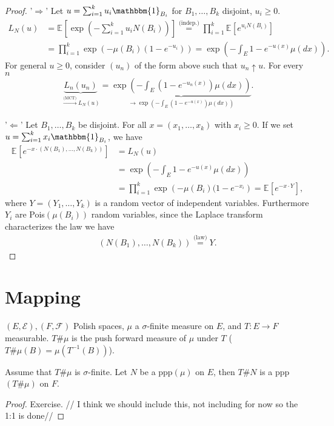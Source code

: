 \begin{proof}
	'$\Longrightarrow$'
	Let $u=\sum_{i=1}^{k} u_i \mathbbm{1}_{B_i} $ for $B_1,\ldots , B_k$ disjoint, $u_i\geq 0$.
	\begin{align}
		L_{N}(u) &= \mathbb{E}_{} \left[ \exp \left( - \sum_{i=1}^{k} u_iN(B_i) \right) \right]  \stackrel{\textrm{(indep.)}}{=} \prod_{i=1}^{k}\mathbb{E}_{} \left[ e^{u_iN(B_i)} \right] \\
			 &=\prod_{i=1}^{k} \exp\left( -\mu (B_i) (1-e^{-u_i}) \right) = \exp \left( - \int_{E}^{} 1-e^{-u(x)}\mu (dx) \right).
	\end{align}
	For general $u\geq 0$, consider $(u_n)$ of the form above such that $u_n \uparrow u$. For every $n$ 
	\begin{align}
		\underbrace{L_n(u_n)}_{\stackrel{\textrm{(MCT)}}{\to}L_N(u)} = \underbrace{\exp \left( - \int_{E}^{} (1-e^{-u_n(x)})\mu (dx) \right)}_{\to \exp\left( - \int_{E}^{} (1-e^{-u(x)}) \mu (dx)\right)}.
	\end{align}

	'$\Longleftarrow$'
	Let $B_1,\ldots , B_k$ be disjoint. For all $x=(x_1,\ldots ,x_k)$ with $x_i\geq 0$. {\color{blue}If we set $u= \sum_{i=1}^{k} x_i \mathbbm{1}_{B_i} $, we have}
\begin{align}
	\mathbb{E}_{} \left[ e^{-x \cdot (N(B_1),\ldots ,N(B_k))} \right] &= L_{N}(u) \\
									  &= \exp \left( - \int_{E}^{} 1 - e^{-u(x)}\mu (dx) \right) \\
									  &= \prod_{i=1}^{k}\exp \left(-\mu (B_i) (1- e^{-x_i} \right) = \mathbb{E}_{} \left[ e^{-x \cdot Y} \right] ,
\end{align}
where $Y=(Y_1, \ldots , Y_k)$ is a random vector of independent variables. Furthermore $Y_i$ are Pois$(\mu (B_i))$ random variables, since the Laplace transform characterizes the law we have
\begin{align}
	(N(B_1), \ldots ,N(B_k)) \stackrel{\textrm{(law)}}{=} Y.
\end{align}
\end{proof}

\section{Mapping}
$(E, \mathcal{E}), (F, \mathcal{F})$ Polish spaces, $\mu$ a $ \sigma$-finite measure on $E$, and $T:E \to F$ measurable. $T\#\mu $ is the push forward measure of $\mu $ under $T$ ($T\#\mu(B)=\mu(T^{-1}(B))$).

\begin{theorem}[]
	Assume that $T\#\mu$ is $\sigma$-finite. Let $N$ be a ppp$(\mu)$ on $E$, then $T\#N$ is a ppp$(T\#\mu)$ on $F$.
\end{theorem}
\begin{proof}
	Exercise. 
	{\color{blue} // I think we should include this, not including for now so the 1:1 is done//}
\end{proof}

